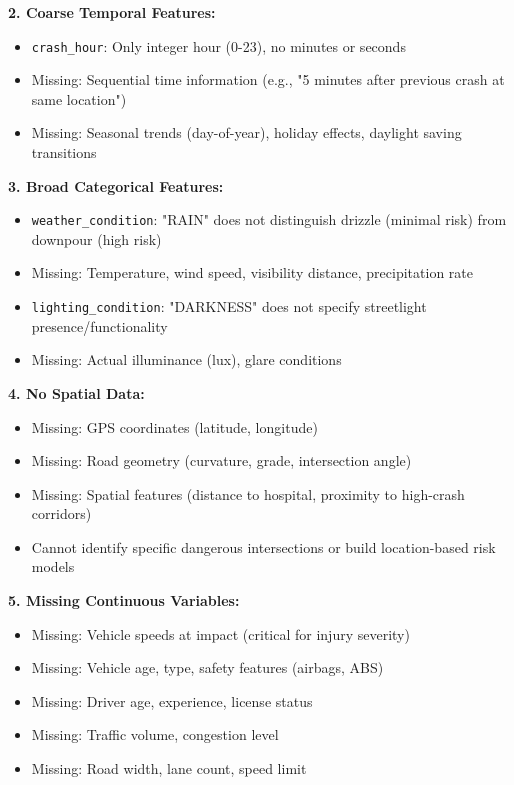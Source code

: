 \documentclass[12pt,man]{apa7}
\begin{document}
\textbf{2. Coarse Temporal Features:}
\begin{itemize}
    \item \texttt{crash\_hour}: Only integer hour (0-23), no minutes or seconds
    \item Missing: Sequential time information (e.g., "5 minutes after previous crash at same location")
    \item Missing: Seasonal trends (day-of-year), holiday effects, daylight saving transitions
\end{itemize}

\textbf{3. Broad Categorical Features:}
\begin{itemize}
    \item \texttt{weather\_condition}: "RAIN" does not distinguish drizzle (minimal risk) from downpour (high risk)
    \item Missing: Temperature, wind speed, visibility distance, precipitation rate
    \item \texttt{lighting\_condition}: "DARKNESS" does not specify streetlight presence/functionality
    \item Missing: Actual illuminance (lux), glare conditions
\end{itemize}

\textbf{4. No Spatial Data:}
\begin{itemize}
    \item Missing: GPS coordinates (latitude, longitude)
    \item Missing: Road geometry (curvature, grade, intersection angle)
    \item Missing: Spatial features (distance to hospital, proximity to high-crash corridors)
    \item Cannot identify specific dangerous intersections or build location-based risk models
\end{itemize}

\textbf{5. Missing Continuous Variables:}
\begin{itemize}
    \item Missing: Vehicle speeds at impact (critical for injury severity)
    \item Missing: Vehicle age, type, safety features (airbags, ABS)
    \item Missing: Driver age, experience, license status
    \item Missing: Traffic volume, congestion level
    \item Missing: Road width, lane count, speed limit
\end{itemize}
\end{document}
